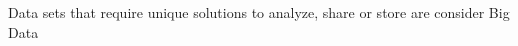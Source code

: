 
\begin{frame}
		
		Data sets that require unique solutions to analyze, share or store are
		consider Big Data

\end{frame}



